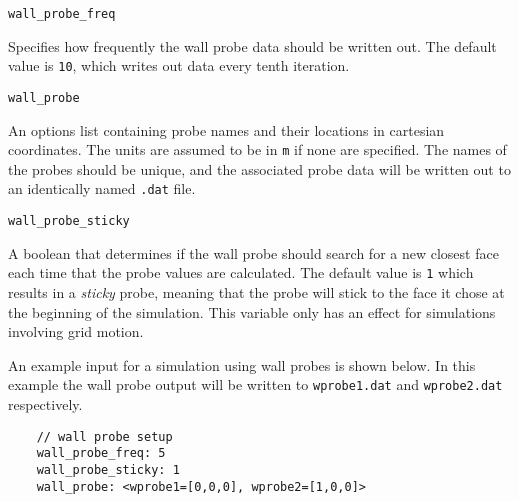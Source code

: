 \documentclass{article}
\begin{document}
  \begin{list}{}{}

  \item {\tt wall\_probe\_freq}

    Specifies how frequently the wall probe data should be written out. The default value is {\tt 10}, which writes out data every tenth iteration.
    
  \item {\tt wall\_probe}
  
    An options list containing probe names and their locations in cartesian coordinates. The units are assumed to be in {\tt m} if none are specified. The names of the probes should be unique, and the associated probe data will be written out to an identically named {\tt .dat} file.
  
  \item {\tt wall\_probe\_sticky}
     
    A boolean that determines if the wall probe should search for a new closest face each time that the probe values are calculated. The default value is {\tt 1} which results in a \textit{sticky} probe, meaning that the probe will stick to the face it chose at the beginning of the simulation. This variable only has an effect for simulations involving grid motion.
    
  \end{list}

An example input for a simulation using wall probes is shown below. In this example the wall probe output will be written to {\tt wprobe1.dat} and {\tt wprobe2.dat} respectively.

\begin{verbatim}
	// wall probe setup
	wall_probe_freq: 5
	wall_probe_sticky: 1
	wall_probe: <wprobe1=[0,0,0], wprobe2=[1,0,0]>
\end{verbatim}


\clearpage
\end{document}
